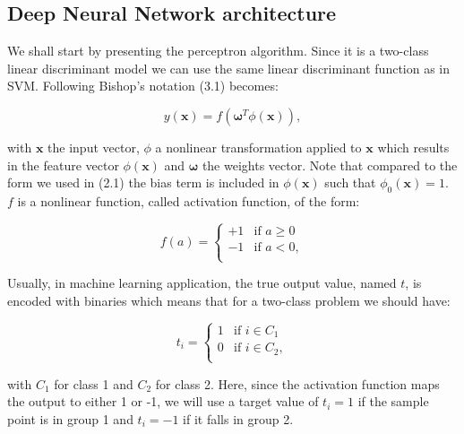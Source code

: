 \documentclass[a4paper,12pt]{article}
\numberwithin{equation}{section}
\begin{document}
\subsection{Deep Neural Network architecture}

We shall start by presenting the perceptron algorithm. Since it is a two-class linear discriminant model we can use the same linear discriminant function as in SVM. Following Bishop's notation (3.1) becomes:

\begin{equation}\label{eq:1}
y(\boldsymbol{x}) = f(\boldsymbol{\omega}^T\phi(\boldsymbol{x})),
\end{equation}

\noindent
with $\boldsymbol{x}$ the input vector, $\phi$ a nonlinear transformation applied to $\boldsymbol{x}$ which results in the feature vector $\phi(\boldsymbol{x})$ and $\boldsymbol{\omega}$ the weights vector. Note that compared to the form we used in (2.1) the bias term is included in $\phi(\boldsymbol{x})$ such that $\phi_0(\boldsymbol{x})=1$. $f$ is a nonlinear function, called activation function, of the form:

\begin{equation}\label{eq:2}
    f(a) = \begin{cases}
               +1               & \mbox{if }a \geq 0\\
               -1               & \mbox{if }a <0, \\
           \end{cases}
\end{equation}

Usually, in machine learning application, the true output value, named $t$, is encoded with binaries which means that for a two-class problem we should have:

\begin{equation}\label{eq:3}
    t_i = \begin{cases}
               1             & \mbox{if }i \in C_1\\
               0              & \mbox{if }i \in  C_2, \\
           \end{cases}
\end{equation}

\noindent
with $C_1$ for class 1 and $C_2$ for class 2. Here, since the activation function maps the output to either 1 or -1, we will use a target value of $t_i = 1$ if the sample point is in group 1 and $t_i = -1$ if it falls in group 2. 
\end{document}
